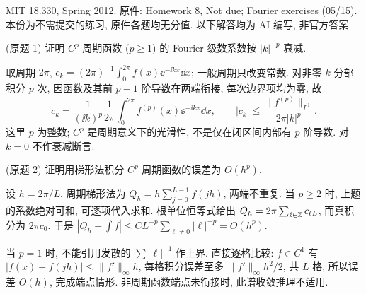 MIT 18.330, Spring 2012. 原件: Homework 8, Not due; Fourier exercises (05/15). 本份为不需提交的练习, 原件各题均无分值. 以下解答均为 AI 编写, 非官方答案.

\begin{exercise}\label{ps8-q1}
(原题 1) 证明 $C^p$ 周期函数 ($p\ge1$) 的 Fourier 级数系数按 $|k|^{-p}$ 衰减.
\end{exercise}
\begin{solution}
取周期 $2\pi$, $c_k=(2\pi)^{-1}\int_0^{2\pi}f(x)\ee^{-\ii kx}\dd x$; 一般周期只改变常数. 对非零 $k$ 分部积分 $p$ 次, 因函数及其前 $p-1$ 阶导数在两端衔接, 每次边界项均为零, 故
\[
c_k=\frac1{(\ii k)^p}\frac1{2\pi}
\int_0^{2\pi}f^{(p)}(x)\ee^{-\ii kx}\dd x,
\qquad |c_k|\le\frac{\|f^{(p)}\|_{L^1}}{2\pi|k|^p}.
\]
这里 $p$ 为整数; $C^p$ 是周期意义下的光滑性, 不是仅在闭区间内部有 $p$ 阶导数. 对 $k=0$ 不作衰减断言.
\end{solution}

\begin{exercise}\label{ps8-q2}
(原题 2) 证明用梯形法积分 $C^p$ 周期函数的误差为 $O(h^p)$.
\end{exercise}
\begin{solution}
设 $h=2\pi/L$, 周期梯形法为 $Q_h=h\sum_{j=0}^{L-1}f(jh)$, 两端不重复.
当 $p\ge2$ 时, 上题的系数绝对可和, 可逐项代入求和. 根单位恒等式给出
$Q_h=2\pi\sum_{\ell\in\mathbb Z}c_{\ell L}$, 而真积分为 $2\pi c_0$.
于是 $|Q_h-\int f|\le C L^{-p}\sum_{\ell\ne0}|\ell|^{-p}=O(h^p)$.

当 $p=1$ 时, 不能引用发散的 $\sum |\ell|^{-1}$ 作上界. 直接逐格比较: $f\in C^1$ 有 $|f(x)-f(jh)|\le\|f'\|_\infty h$,
每格积分误差至多 $\|f'\|_\infty h^2/2$, 共 $L$ 格, 所以误差 $O(h)$, 完成端点情形. 非周期函数端点未衔接时, 此谱收敛推理不适用.
\end{solution}

